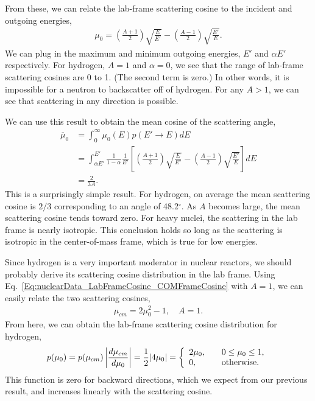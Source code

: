 From these, we can relate the lab-frame scattering cosine to the incident and outgoing energies,
\begin{align}
  \mu_0 = \left( \frac{A+1}{2} \right) \sqrt{\frac{E}{E'}} - \left( \frac{A-1}{2} \right) \sqrt{\frac{E'}{E}} .
\end{align}
We can plug in the maximum and minimum outgoing energies, $E'$ and $\alpha E'$ respectively. For hydrogen, $A = 1$ and $\alpha = 0$, we see that the range of lab-frame scattering cosines are 0 to 1. (The second term is zero.) In other words, it is impossible for a neutron to backscatter off of hydrogen. For any $A > 1$, we can see that scattering in any direction is possible. 

We can use this result to obtain the mean cosine of the scattering angle,
\begin{align}
  \overline{\mu}_0 
  &= \int_0^\infty \mu_0(E) p(E' \rightarrow E ) dE \nonumber \\ 
  &= \int_{\alpha E'}^{E'} \frac{1}{1 - \alpha} \frac{1}{E'} \left[  \left( \frac{A+1}{2} \right) \sqrt{\frac{E}{E'}} - \left( \frac{A-1}{2} \right) \sqrt{\frac{E'}{E}} \right] dE \nonumber \\
  &= \frac{2}{3A} .
\end{align}
This is a surprisingly simple result. For hydrogen, on average the mean scattering cosine is $2/3$ corresponding to an angle of 48.2$^\circ$. As $A$ becomes large, the mean scattering cosine tends toward zero. For heavy nuclei, the scattering in the lab frame is nearly isotropic. This conclusion holds so long as the scattering is isotropic in the center-of-mass frame, which is true for low energies.

Since hydrogen is a very important moderator in nuclear reactors, we should probably derive its scattering cosine distribution in the lab frame. Using Eq.~\eqref{Eq:nuclearData_LabFrameCosine_COMFrameCosine} with $A = 1$, we can easily relate the two scattering cosines,
\begin{align}
  \mu_{cm} = 2 \mu_0^2 - 1, \quad A = 1. \nonumber
\end{align}
From here, we can obtain the lab-frame scattering cosine distribution for hydrogen,
\begin{align}
  p(\mu_0) = p(\mu_{cm}) \left| \frac{d\mu_{cm}}{d\mu_0} \right| = \frac{1}{2} | 4 \mu_0 | 
  = \left\{ \begin{array}{l l}
  2 \mu_0 , & \quad 0 \le \mu_0 \le 1, \\
  0,		& \quad \text{otherwise}. \\ \end{array} \right.
\end{align}
This function is zero for backward directions, which we expect from our previous result, and increases linearly with the scattering cosine.

